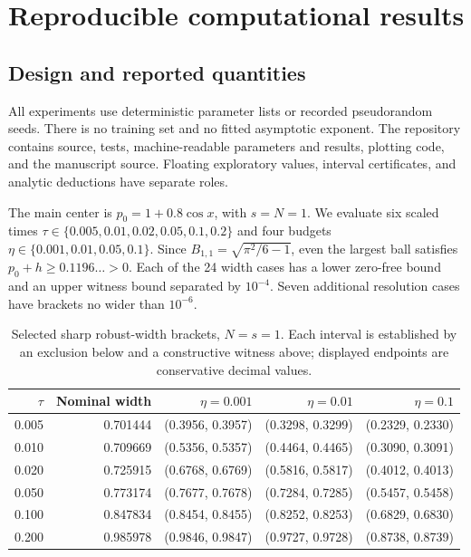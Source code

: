 \documentclass[11pt]{article}
\begin{document}
\section{Reproducible computational results}
\subsection{Design and reported quantities}
All experiments use deterministic parameter lists or recorded pseudorandom seeds. There is no training set and no fitted asymptotic exponent. The repository contains source, tests, machine-readable parameters and results, plotting code, and the manuscript source. Floating exploratory values, interval certificates, and analytic deductions have separate roles.

The main center is $p_0=1+0.8\cos x$, with $s=N=1$. We evaluate six scaled times $\tau\in\{0.005,0.01,0.02,0.05,0.1,0.2\}$ and four budgets $\eta\in\{0.001,0.01,0.05,0.1\}$. Since $B_{1,1}=\sqrt{\pi^2/6-1}$, even the largest ball satisfies $p_0+h\ge0.1196\ldots>0$. Each of the 24 width cases has a lower zero-free bound and an upper witness bound separated by $10^{-4}$. Seven additional resolution cases have brackets no wider than $10^{-6}$.

\begin{table}[t]
\centering\small
\caption{Selected sharp robust-width brackets, $N=s=1$. Each interval is established by an exclusion below and a constructive witness above; displayed endpoints are conservative decimal values.}\label{tab:widths}
\begin{tabular}{@{}rrrrr@{}}\toprule
$\tau$ & Nominal width & $\eta=0.001$ & $\eta=0.01$ & $\eta=0.1$\\\midrule
0.005 & 0.701444 & (0.3956, 0.3957) & (0.3298, 0.3299) & (0.2329, 0.2330)\\
0.010 & 0.709669 & (0.5356, 0.5357) & (0.4464, 0.4465) & (0.3090, 0.3091)\\
0.020 & 0.725915 & (0.6768, 0.6769) & (0.5816, 0.5817) & (0.4012, 0.4013)\\
0.050 & 0.773174 & (0.7677, 0.7678) & (0.7284, 0.7285) & (0.5457, 0.5458)\\
0.100 & 0.847834 & (0.8454, 0.8455) & (0.8252, 0.8253) & (0.6829, 0.6830)\\
0.200 & 0.985978 & (0.9846, 0.9847) & (0.9727, 0.9728) & (0.8738, 0.8739)\\\bottomrule
\end{tabular}
\end{table}
\end{document}
